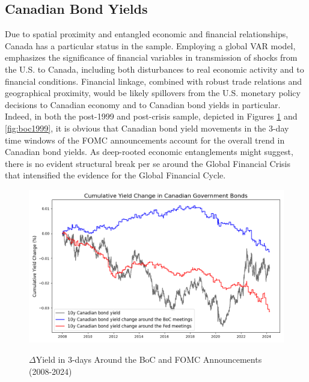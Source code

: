 
\subsection{Canadian Bond Yields}

Due to spatial proximity and entangled economic and financial relationships, Canada has a particular status in the sample. Employing a global VAR model, \citet{beaton2011financial} emphasizes the significance of financial variables in transmission of shocks from the U.S. to Canada, including both disturbances to real economic activity and to financial conditions. Financial linkage, combined with robust trade relations and geographical proximity, would be likely spillovers from the U.S. monetary policy decisions to Canadian economy and to Canadian bond yields in particular. Indeed, in both the post-1999 and post-crisis sample, depicted in Figures \ref{fig:canada2008} and \ref{fig:boc1999}, it is obvious that Canadian bond yield movements in the 3-day time windows of the FOMC announcements account for the overall trend in Canadian bond yields. As deep-rooted economic entanglements might suggest, there is no evident structural break per se around the Global Financial Crisis that intensified the evidence for the Global Financial Cycle.

\begin{figure}[!htbp]
    \centering
    \caption{$\Delta$Yield in 3-days Around the BoC and FOMC Announcements (2008-2024)}
    \includegraphics[width=\textwidth]{figures/2008_canadian_bond_figure1a.png}
    \label{fig:canada2008}
\end{figure}


